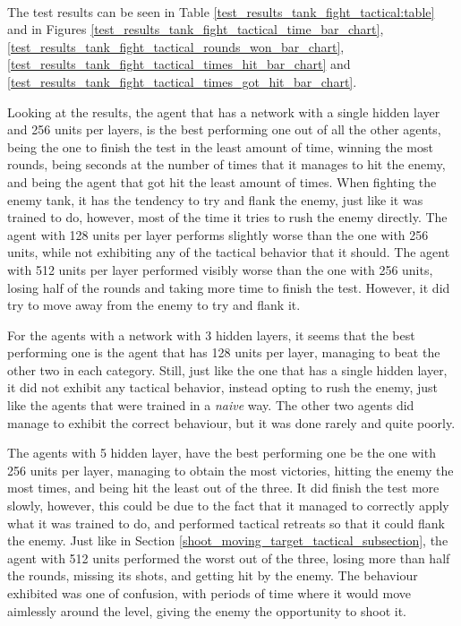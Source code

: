 \paragraph{}
The test results can be seen in Table \ref{test_results_tank_fight_tactical:table} and in Figures \ref{test_results_tank_fight_tactical_time_bar_chart}, \ref{test_results_tank_fight_tactical_rounds_won_bar_chart}, \ref{test_results_tank_fight_tactical_times_hit_bar_chart} and \ref{test_results_tank_fight_tactical_times_got_hit_bar_chart}.

Looking at the results, the agent that has a network with a single hidden layer and 256 units per layers, is the best performing one out of all the other agents, being the one to finish the test in the least amount of time, winning the most rounds, being seconds at the number of times that it manages to hit the enemy, and being the agent that got hit the least amount of times. When fighting the enemy tank, it has the tendency to try and flank the enemy, just like it was trained to do, however, most of the time it tries to rush the enemy directly. The agent with 128 units per layer performs slightly worse than the one with 256 units, while not exhibiting any of the tactical behavior that it should. The agent with 512 units per layer performed visibly worse than the one with 256 units, losing half of the rounds and taking more time to finish the test. However, it did try to move away from the enemy to try and flank it.

For the agents with a network with 3 hidden layers, it seems that the best performing one is the agent that has 128 units per layer, managing to beat the other two in each category. Still, just like the one that has a single hidden layer, it did not exhibit any tactical behavior, instead opting to rush the enemy, just like the agents that were trained in a \emph{naive} way. The other two agents did manage to exhibit the correct behaviour, but it was done rarely and quite poorly.

The agents with 5 hidden layer, have the best performing one be the one with 256 units per layer, managing to obtain the most victories, hitting the enemy the most times, and being hit the least out of the three. It did finish the test more slowly, however, this could be due to the fact that it managed to correctly apply what it was trained to do, and performed tactical retreats so that it could flank the enemy. Just like in Section \ref{shoot_moving_target_tactical_subsection}, the agent with 512 units performed the worst out of the three, losing more than half the rounds, missing its shots, and getting hit by the enemy. The behaviour exhibited was one of confusion, with periods of time where it would move aimlessly around the level, giving the enemy the opportunity to shoot it.

